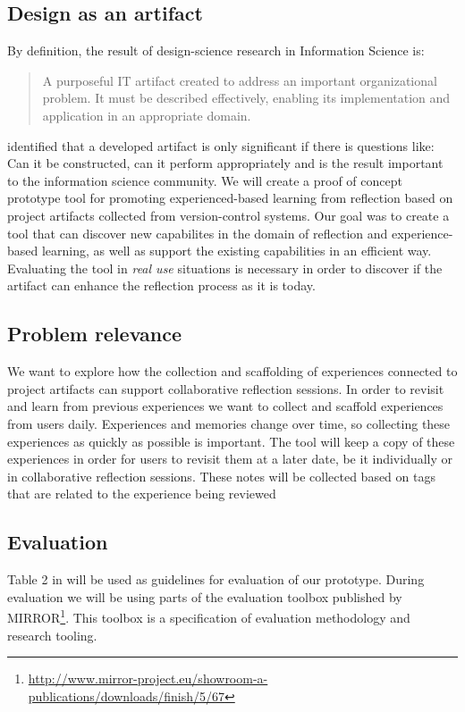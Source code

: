 
\subsection{Design as an artifact}
By definition, the result of design-science research in Information Science is:
\begin{quote}
A purposeful IT artifact created to address an important organizational problem. It must be described effectively, enabling its implementation and application in an appropriate domain.
\end{quote}
\cite{Markus et al. 2002} identified that a developed artifact is only significant if there is questions like: Can it be constructed, can it perform appropriately and is the result important to the information science community. 
We will create a proof of concept prototype tool for promoting experienced-based learning from reflection based on project artifacts collected from version-control systems. Our goal was to create a tool that can discover new capabilites in the domain of reflection and experience-based learning, as well as support the existing capabilities in an efficient way. Evaluating the tool in \emph{real use} situations is necessary in order to discover if the artifact can enhance the reflection process as it is today. 

\subsection{Problem relevance}
We want to explore how the collection and scaffolding of experiences connected to project artifacts can support collaborative reflection sessions. In order to revisit and learn from previous experiences we want to collect and scaffold experiences from users daily. Experiences and memories change over time, so collecting these experiences as quickly as possible is important. The tool will keep a copy of these experiences in order for users to revisit them at a later date, be it individually or in collaborative reflection sessions. These notes will be collected based on tags that are related to the experience being reviewed \cite{Hassan-montero2006}

\subsection{Evaluation}
Table 2 in \cite{Esearch2004} will be used as guidelines for evaluation of our prototype. 
During evaluation we will be using parts of the evaluation toolbox published by MIRROR\footnote{\url{http://www.mirror-project.eu/showroom-a-publications/downloads/finish/5/67}}. This toolbox is a specification of evaluation methodology and research tooling. 

